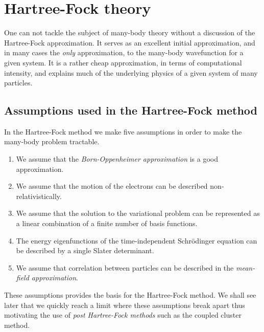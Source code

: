 \chapter{Hartree-Fock theory}
    One can not tackle the subject of many-body theory without a discussion of
    the Hartree-Fock approximation. It serves as an excellent initial
    approximation, and in many cases the \emph{only} approximation, to the
    many-body wavefunction for a given system. It is a rather cheap
    approximation, in terms of computational intensity, and explains much of the
    underlying physics of a given system of many particles.

    \section{Assumptions used in the Hartree-Fock method}
        In the Hartree-Fock method we make five assumptions in order to make the
        many-body problem tractable.
        \begin{enumerate}
            \item We assume that the \emph{Born-Oppenheimer approximation} is a
                good approximation.
            \item We assume that the motion of the electrons can be described
                non-relativistically.
            \item We assume that the solution to the variational problem can be
                represented as a linear combination of a finite number of basis
                functions.
            \item The energy eigenfunctions of the time-independent Schrödinger
                equation can be described by a single Slater determinant.
            \item We assume that correlation between particles can be described
                in the \emph{mean-field approximation}.
        \end{enumerate}
        These assumptions provides the basis for the Hartree-Fock method. We
        shall see later that we quickly reach a limit where these assumptions
        break apart thus motivating the use of \emph{post Hartree-Fock methods}
        such as the coupled cluster method.

